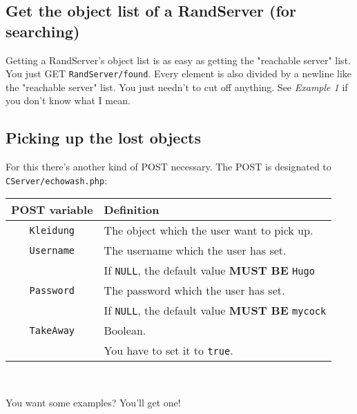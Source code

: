\documentclass[letterpaper,twoside]{scrartcl}
\begin{document}
  \subsection{Get the object list of a RandServer (for searching)}
   Getting a RandServer's object list is as easy as getting the "reachable server" list. You just GET \texttt{RandServer/found}.
   Every element is also divided by a newline like the "reachable server" list. You just needn't to cut off anything.
   \newline
   See \textit{Example 1} if you don't know what I mean.


 \newpage


  \subsection{Picking up the lost objects}
   For this there's another kind of POST necessary.\newline
   The POST is designated to \texttt{CServer/echowash.php}:\newline\newline
   \begin{tabular}[ht]{|c|l|}
    \hline
    POST variable & Definition\\
    \hline\hline
    \texttt{Kleidung} & The object which the user want to pick up.\\
    \hline
    \texttt{Username} & The username which the user has set.\\
 		   & If \texttt{NULL}, the default value \textbf{MUST BE} \texttt{Hugo}\\
    \hline
    \texttt{Password} & The password which the user has set.\\
		   & If \texttt{NULL}, the default value \textbf{MUST BE} \texttt{mycock}\\
    \hline
    \texttt{TakeAway} & Boolean. \\
 	  & You have to set it to \texttt{true}. \\
    \hline
   \end{tabular}
   \\
   \newline

   You want some examples? You'll get one!
   \newline
   \newline\newline
\end{document}
